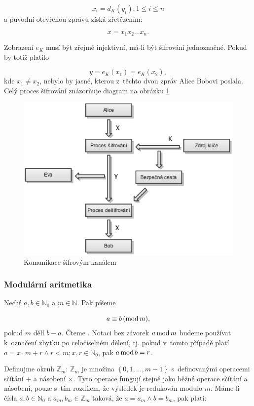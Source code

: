 \documentclass[12pt]{article}
\theoremstyle{definition}
\newcommand{\setz}{\mathbb{Z}}
\renewcommand{\mod}{\mbox{mod\,}}
\begin{document}
$$x_i=d_K\left(y_i\right), 1\le i \le n$$
a původní otevřenou zprávu získá zřetězením:

$$x=x_1x_2\ldots x_n.$$

Zobrazení $e_K$ musí být zřejmě injektivní, má-li být šifrování jednoznačné. Pokud by totiž platilo

$$y=e_K(x_1)=e_K(x_2),$$
kde $x_1\ne x_2$, nebylo by jasné, kterou z~těchto dvou zpráv Alice Bobovi poslala. Celý proces šifrování znázorňuje diagram na obrázku \ref{img_cryptosystem}

\begin{figure}[h]
  \begin{center}
  \includegraphics[scale=0.8]{images/cryptosystem.eps}
  \end{center}
\caption{Komunikace šifrovým kanálem}
\label{img_cryptosystem}
\end{figure}

\subsubsection{Modulární aritmetika}
Nechť $a, b\in\mathbb{N}_0$ a $m\in\mathbb{N}$. Pak píšeme

$$a\equiv b \,(\mod m),$$
pokud $m$ dělí $b-a$. Čteme . Notaci bez závorek $a\, \mod m$ budeme používat k~označení zbytku po celočíselném dělení, tj. pokud v~tomto případě platí $a=x\cdot m+r\wedge r < m; x,r\in\mathbb{N}_0$, pak $a\,\mod b = r$.

Definujme okruh $\setz_m$: $\setz_m$ je množina $\left\{0, 1, \ldots, m-1\right\}$ s~definovanými operacemi sčítání $+$ a násobení $\times$. Tyto operace fungují stejně jako běžné operace sčítání a násobení, pouze s~tím rozdílem, že výsledek je redukován modulo $m$. Máme-li čísla $a,b\in\mathbb{N}_0$ a $a_m,b_m\in \setz_m$ taková, že $a=a_m\wedge b=b_m$, pak platí:
\end{document}
